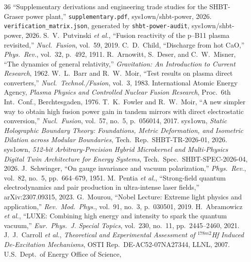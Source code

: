 \documentclass[11pt,journal,compsoc]{IEEEtran}
\begin{document}
\begin{thebibliography}{36}
 ``Supplementary derivations and engineering trade
  studies for the SHBT-Graser power plant,'' \texttt{supplementary.pdf},
  sys1own/shbt-power, 2026.
 \texttt{verification\_matrix.json}, generated by
  \texttt{shbt-power-audit}, sys1own/shbt-power, 2026.
 S.~V.~Putvinski \emph{et al.}, ``Fusion reactivity of the
  p--B11 plasma revisited,'' \emph{Nucl.\ Fusion}, vol.~59, 2019.
 C.~D.~Child, ``Discharge from hot CaO,''
  \emph{Phys.\ Rev.}, vol.~32, p.~492, 1911.
 R.~Arnowitt, S.~Deser, and C.~W.~Misner, ``The dynamics of
  general relativity,'' \emph{Gravitation: An Introduction to Current
  Research}, 1962.
 W.~L.~Barr and R.~W.~Moir, ``Test results on plasma
  direct converters,'' \emph{Nucl.\ Technol./Fusion}, vol.~3, 1983.
 International Atomic Energy Agency, \emph{Plasma Physics
  and Controlled Nuclear Fusion Research}, Proc.\ 6th Int.\ Conf.,
  Berchtesgaden, 1976.
 T.~K.~Fowler and R.~W.~Moir, ``A new simpler way to
  obtain high fusion power gain in tandem mirrors with direct electrostatic
  conversion,'' \emph{Nucl.\ Fusion}, vol.~57, no.~5, p.~056014, 2017.
 sys1own, \emph{Static Holographic Boundary
  Theory: Foundations, Metric Deformation, and Isometric Dilation across
  Modular Boundaries}, Tech.\ Rep.\ SHBT-TR-2026-01, 2026.
 sys1own, \emph{512-bit Arbitrary-Precision
  Hybrid Microkernel and Multi-Physics Digital Twin Architecture for
  Energy Systems}, Tech.\ Spec.\ SHBT-SPEC-2026-04, 2026.
 J.~Schwinger, ``On gauge invariance and vacuum
  polarization,'' \emph{Phys.\ Rev.}, vol.~82, no.~5, pp.~664--679, 1951.
 M.~Pentia \emph{et al.}, ``Strong-field quantum
  electrodynamics and pair production in ultra-intense laser fields,''
  arXiv:2307.09315, 2023.
 G.~Mourou, ``Nobel Lecture: Extreme light physics and
  application,'' \emph{Rev.\ Mod.\ Phys.}, vol.~91, no.~3, p.~030501, 2019.
 H.~Abramowicz \emph{et al.}, ``LUXE: Combining high
  energy and intensity to spark the quantum vacuum,'' \emph{Eur.\ Phys.\ J.
  Special Topics}, vol.~230, no.~11, pp.~2445--2460, 2021.
 J.~J.~Carroll \emph{et al.}, \emph{Theoretical and
  Experimental Assessment of $^{178m2}$Hf Induced De-Excitation
  Mechanisms}, OSTI Rep.\ DE-AC52-07NA27344, LLNL, 2007.
 U.S.~Dept.\ of Energy Office of Science,

\end{thebibliography}
\end{document}
